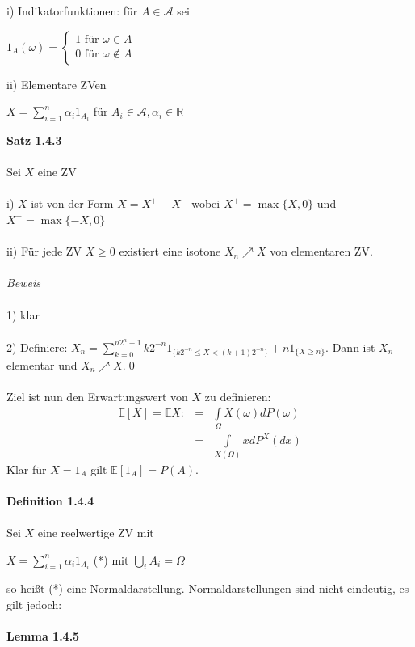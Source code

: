 \documentclass[10pt,a4paper]{report}
\numberwithin{equation}{section}
\numberwithin{figure}{section}
\theoremstyle{plain}
\theoremstyle{definition}
\theoremstyle{plain}
\theoremstyle{definition}
\theoremstyle{remark}
\theoremstyle{plain}
\begin{document}
i) Indikatorfunktionen: für $A \in \mathcal{A}$ sei
\begin{center}
$1_A(\omega)=
\begin{cases}
1 \text{ für } \omega \in A\\
0 \text{ für } \omega \notin A
\end{cases}$
\end{center}
ii) Elementare ZVen
\begin{center}
$X=\sum\limits_{i=1}^n \alpha_i 1_{A_i}$ für $A_i \in \mathcal{A}, \alpha_i \in \mathbb{R}$
\end{center}
\textbf{Satz 1.4.3}\\\\
Sei $X$ eine ZV\\\\
i) $X$ ist von der Form $X=X^+-X^-$ wobei $X^+=\max\{X,0\}$ und $X^-=\max\{-X,0\}$\\\\
ii) Für jede ZV $X\geq0$ existiert eine isotone $X_n \nearrow X$ von elementaren ZV.\\\\
\textit{Beweis}\\\\
1) klar\\\\
2) Definiere: $X_n=\sum\limits_{k=0}^{n2^n-1}k2^{-n}1_{\{k2^{-n}\leq X < (k+1)2^{-n}\}}+n1_{\{X\geq n\}}$. Dann ist $X_n$ elementar und $X_n \nearrow X$.\qed\\\\
Ziel ist nun den Erwartungswert von $X$ zu definieren:
\begin{eqnarray*}
\mathbb{E}[X]=\mathbb{E}X:&=&\int\limits_\Omega X(\omega)dP(\omega)\\
&=&\int\limits_{X(\Omega)}x dP^X(dx)
\end{eqnarray*} 
Klar für $X=1_A$ gilt $\mathbb{E}[1_A]=P(A)$.\\\\
\textbf{Definition 1.4.4}\\\\
Sei $X$ eine reelwertige ZV mit
\begin{center}
$X=\sum\limits_{i=1}^n\alpha_i1_{A_i}$ (*) mit $\bigcup_i^\cdot A_i=\Omega$
\end{center}
so heißt (*) eine Normaldarstellung. Normaldarstellungen sind nicht eindeutig, es gilt jedoch:\\\\
\textbf{Lemma 1.4.5}\\\\
\end{document}
